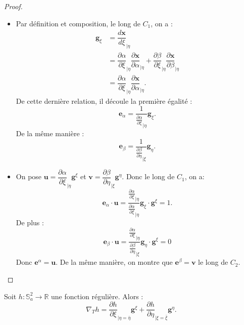 \begin{proof}
\begin{itemize}
\item Par définition et composition, le long de $C_1$, on a :
\begin{align*}
\mathbf{g}_{\xi} & = \dfrac{d \mathbf{x}}{d \xi}_{|\eta}\\
	& = \dfrac{\partial \alpha}{\partial \xi}_{|\eta} \dfrac{\partial \mathbf{x}}{\partial \alpha}_{|\eta} + \dfrac{\partial \beta}{\partial \xi}_{|\eta} \dfrac{\partial \mathbf{x}}{\partial \beta}_{|\eta}\\
	& = \dfrac{\partial \alpha}{\partial \xi}_{|\eta} \dfrac{\partial \mathbf{x}}{\partial \alpha}_{|\eta}.
\end{align*}
De cette dernière relation, il découle la première égalité :
\begin{equation}
\mathbf{e}_{\alpha} = \dfrac{1}{\frac{\partial \alpha}{\partial \xi}_{|\eta}} \mathbf{g}_{\xi}.
\end{equation}
De la même manière :
\begin{equation}
\mathbf{e}_{\beta} = \dfrac{1}{\frac{\partial \beta}{\partial \eta}_{|\xi}} \mathbf{g}_{\eta}.
\end{equation}

\item On pose $\mathbf{u} = \dfrac{\partial \alpha}{\partial \xi}_{|\eta} \mathbf{g}^{\xi}$ et $\mathbf{v} = \dfrac{\partial \beta}{\partial \eta}_{|\xi} \mathbf{g}^{\eta}$. Donc le long de $C_1$, on a:
\begin{equation}
\mathbf{e}_{\alpha} \cdot \mathbf{u} = \dfrac{\frac{\partial \alpha}{\partial \xi}_{|\eta}}{\frac{\partial \alpha}{\partial \xi}_{|\eta}} \mathbf{g}_{\xi} \cdot \mathbf{g}^{\xi} = 1.
\end{equation}
De plus :
\begin{equation}
\mathbf{e}_{\beta} \cdot \mathbf{u} = \dfrac{\frac{\partial \alpha}{\partial \xi}_{|\eta}}{\frac{\partial \beta}{\partial \eta}_{|\xi}} \mathbf{g}_{\eta} \cdot \mathbf{g}^{\xi} = 0
\end{equation}
Donc $\mathbf{e}^{\alpha} = \mathbf{u}$. De la même manière, on montre que $\mathbf{e}^{\beta} = \mathbf{v}$ le long de $C_2$.
\end{itemize}
\end{proof}




\begin{theoreme}
Soit $h : \mathbb{S}_a^2 \rightarrow \mathbb{R}$ une fonction régulière. Alors :
\begin{equation}
\nabla_T h = \dfrac{\partial h}{\partial \xi}_{|\eta = \bar{\eta}} \mathbf{g}^{\xi} + \dfrac{\partial h}{\partial \eta}_{|\xi = \bar{\xi}} \mathbf{g}^{\eta}.
\end{equation}
\label{th:gradient_xieta}
\end{theoreme}


